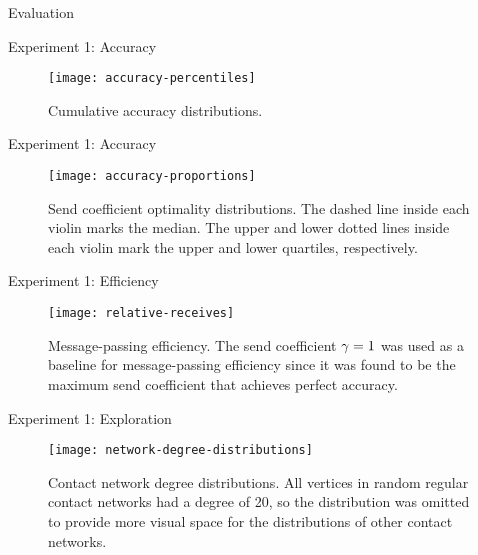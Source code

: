 \documentclass[11pt]{beamer}
\begin{document}
\begin{section}{Evaluation}

\begin{frame}{Experiment 1: Accuracy}
\begin{figure}
  \centering
  \texttt{[image: accuracy-percentiles]}
  \caption[Cumulative accuracy distributions]{Cumulative accuracy distributions.}
\end{figure}
\end{frame}

\begin{frame}{Experiment 1: Accuracy}
\begin{figure}
  \centering
  \texttt{[image: accuracy-proportions]}
  \caption[Send coefficient optimality distributions]{Send coefficient optimality distributions. The dashed line inside each violin marks the median. The upper and lower dotted lines inside each violin mark the upper and lower quartiles, respectively.}
\end{figure}
\end{frame}

\begin{frame}{Experiment 1: Efficiency}
\begin{figure}
  \centering
  \texttt{[image: relative-receives]}
  \caption[Message-passing efficiency]{Message-passing efficiency. The send coefficient $\gamma = 1$ was used as a baseline for message-passing efficiency since it was found to be the maximum send coefficient that achieves perfect accuracy.}
\end{figure}
\end{frame}


\begin{frame}{Experiment 1: Exploration}
\begin{figure}
  \centering
  \texttt{[image: network-degree-distributions]}
  \caption[Contact network degree distributions]{Contact network degree distributions. All vertices in random regular contact networks had a degree of 20, so the distribution was omitted to provide more visual space for the distributions of other contact networks.}
\end{figure}
\end{frame}


\end{section}
\end{document}
